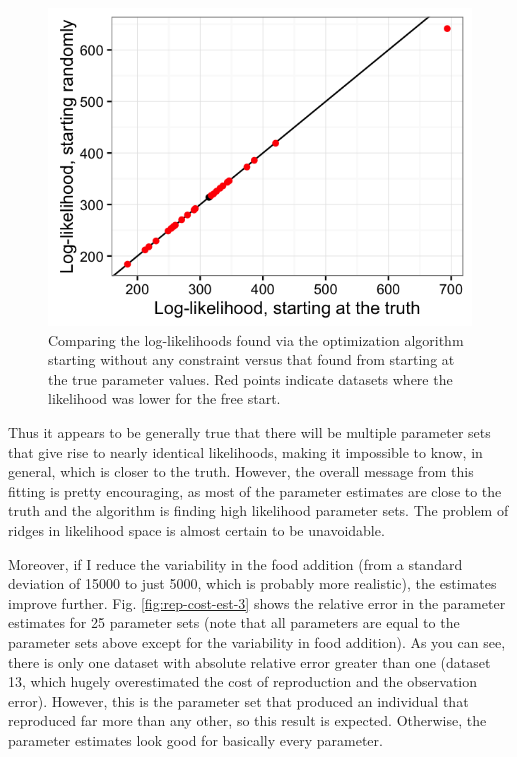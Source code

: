 \documentclass[12pt,reqno,final,pdftex]{amsart}\usepackage[]{graphicx}\usepackage[]{color}
\newenvironment{knitrout}{}{} %
\theoremstyle{plain}
\numberwithin{equation}{part}
\begin{document}
\begin{knitrout}\scriptsize
{}\color{fgcolor}\begin{figure}

\includegraphics[width=\linewidth]{figure/lik-comparison-2-1} \hfill{}

\caption[Comparing the log-likelihoods found via the optimization algorithm starting without any constraint versus that found from starting at the true parameter values]{Comparing the log-likelihoods found via the optimization algorithm starting without any constraint versus that found from starting at the true parameter values. Red points indicate datasets where the likelihood was lower for the free start.}\label{fig:lik-comparison-2}
\end{figure}


\end{knitrout}

\clearpage

Thus it appears to be generally true that there will be multiple parameter sets that give rise to nearly identical likelihoods, making it impossible to know, in general, which is closer to the truth.
However, the overall message from this fitting is pretty encouraging, as most of the parameter estimates are close to the truth and the algorithm is finding high likelihood parameter sets.
The problem of ridges in likelihood space is almost certain to be unavoidable.

Moreover, if I reduce the variability in the food addition (from a standard deviation of 15000 to just 5000, which is probably more realistic), the estimates improve further.
Fig. \ref{fig:rep-cost-est-3} shows the relative error in the parameter estimates for 25 parameter sets (note that all parameters are equal to the parameter sets above except for the variability in food addition).
As you can see, there is only one dataset with absolute relative error greater than one (dataset 13, which hugely overestimated the cost of reproduction and the observation error).
However, this is the parameter set that produced an individual that reproduced far more than any other, so this result is expected.
Otherwise, the parameter estimates look good for basically every parameter.
\end{document}
